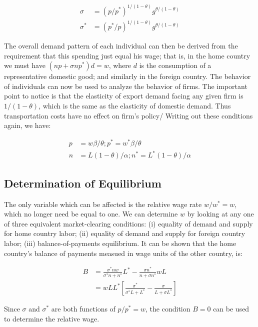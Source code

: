 \begin{equation}
    \begin{aligned}
        \sigma & = (p/p^*)^{1/(1 - \theta)}g^{\theta / (1 - \theta)} \\
        \sigma^* & = (p^*/p)^{1/(1 - \theta)}g^{\theta / (1 - \theta)}
    \end{aligned}
\end{equation}

The overall demand pattern of each individual can then be derived from the requirement that this spending just equal his wage; that is, in the home country we must have $(np + \sigma np^*)d = w$, where $d$ is the consumption of a representative domestic good; and similarly in the foreign country. The behavior of individuals can now be used to analyze the behavior of firms. The important point to notice is that the elasticity of export demand facing any given firm is $1 / (1 - \theta)$, which is the same as the elasticity of domestic demand. Thus transportation costs have no effect on firm's policy/ Writing out these conditions again, we have:

\begin{equation}
    \begin{aligned}
        p & = w\beta / \theta; p^* = w^* \beta / \theta \\
        n & = L(1 - \theta) / \alpha; n^* = L^*(1 - \theta) / \alpha
    \end{aligned}
\end{equation}

\subsection{Determination of Equilibrium}

The only variable which can be affected is the relative wage rate $w / w^* = w$, which no longer need be equal to one. We can determine $w$ by looking at any one of three equivalent market-clearing conditions: (i) equality of demand and supply for home country labor; (ii) equality of demand and supply for foreign country labor; (iii) balance-of-payments equilibrium. It can be shown that the home country's balance of payments measued in wage units of the other country, is:

\begin{equation}
    \begin{aligned}
        B & = \frac{\sigma^* nw}{\sigma^*n + n^*}L^* - \frac{\sigma n^*}{n + \sigma n^*}wL \\
        & = wLL^* \left[ \frac{\sigma^*}{\sigma^* L + L^*} - \frac{\sigma}{L + \sigma L^*}\right]
    \end{aligned}
\end{equation}

Since $\sigma$ and $\sigma^*$ are both functions of $p/p^* = w$, the condition $B = 0$ can be used to determine the relative wage.